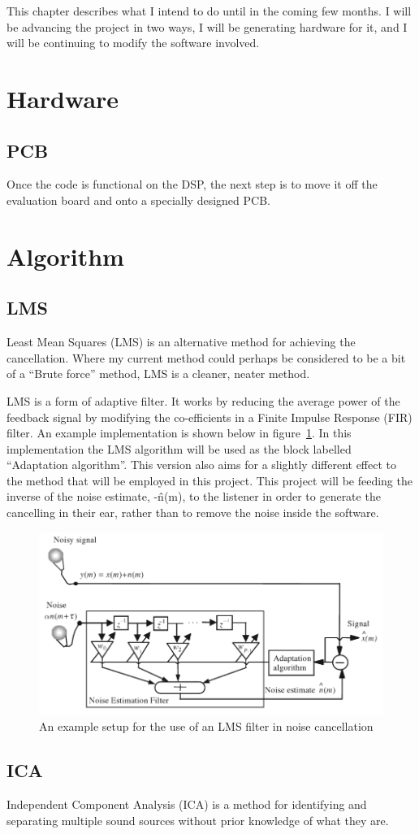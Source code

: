This chapter describes what I intend to do until in the coming few months.
I will be advancing the project in two ways, I will be generating hardware for it, and I will be continuing to modify the software involved.

\section{Hardware}
\subsection{PCB}
Once the code is functional on the DSP, the next step is to move it off the evaluation board and onto a specially designed PCB.

\section{Algorithm}
\subsection{LMS}
\label{sec:LMS}
Least Mean Squares (LMS) is an alternative method for achieving the cancellation.
Where my current method could perhaps be considered to be a bit of a ``Brute force'' method, LMS is a cleaner, neater method.

LMS is a form of adaptive filter.
It works by reducing the average power of the feedback signal by modifying the co-efficients in a Finite Impulse Response (FIR) filter.
An example implementation is shown below in figure~\ref{fig:lmsfilter}.
In this implementation the LMS algorithm will be used as the block labelled ``Adaptation algorithm''.
This version also aims for a slightly different effect to the method that will be employed in this project.
This project will be feeding the inverse of the noise estimate, -\^{n}(m), to the listener in order to generate the cancelling in their ear, rather than to remove the noise inside the software.

\begin{figure}[H]
	\centering
	\includegraphics[width=\textwidth]{./img/lmsfilter.png}
	\caption{An example setup for the use of an LMS filter in noise cancellation \cite{AdvancedDSPing}}
	\label{fig:lmsfilter}
\end{figure}

\subsection{ICA}
Independent Component Analysis (ICA) is a method for identifying and separating multiple sound sources without prior knowledge of what they are.
